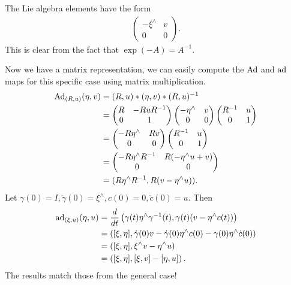\documentclass[12pt,class=article,crop=false]{standalone}
\begin{document}
The Lie algebra elements have the form
\begin{align*}
	\begin{pmatrix} - \xi^\wedge & v\\ 0&0 \end{pmatrix} .
\end{align*}
This is clear from the fact that $ \exp(-A) = A^{-1}$.

Now we have a matrix representation, we can easily compute the $ \operatorname{Ad}$ and  $ \operatorname{ad}$ maps for this specific case using matrix multiplication.
\begin{align*}
	\operatorname{Ad}_{ (R,u)}( \eta,v)  &= (R,u) * (\eta,v) * (R,u)^{-1}   \\
			       &= \begin{pmatrix} R& - RuR^{-1}\\ 0 & 1 \end{pmatrix} \begin{pmatrix} - \eta^\wedge & v \\ 0&0 \end{pmatrix} \begin{pmatrix} R^{-1}&u\\ 0 &1 \end{pmatrix}  \\
			       &= \begin{pmatrix} -R \eta^\wedge & Rv\\ 0 & 0 \end{pmatrix} \begin{pmatrix} R^{-1}&u\\0&1 \end{pmatrix}  \\
			       &= \begin{pmatrix} -R \eta^\wedge R^{-1} & R(- \eta^\wedge u + v) \\ 0&0\end{pmatrix}  \\
			       &= (R \eta^\wedge R^{-1}, R(v - \eta^\wedge u)) .
\end{align*}
Let $ \gamma(0) = I, \dot{ \gamma}(0) = \xi^\wedge, c(0)=0, \dot{c}(0)=u $. Then
\begin{align*}
	\operatorname{ad}_{ ( \xi, u)} (\eta,u) &= \frac{d}{dt} \left( \gamma(t) \eta^\wedge \gamma^{-1}(t), \gamma(t) (v - \eta^\wedge c(t)) \right)  \\
				  &= \left( [ \xi, \eta], \dot{ \gamma}(0) v- \dot{ \gamma}(0) \eta^\wedge c(0) - \gamma(0) \eta^\wedge \dot{c}(0)  \right)  \\
				  &= \left( [ \xi, \eta], \xi^\wedge v - \eta^\wedge u  \right)  \\
				  &= \left( [ \xi, \eta], [\xi,v] - [\eta,u] \right)  .
\end{align*}
The results match those from the general case!
\end{document}
